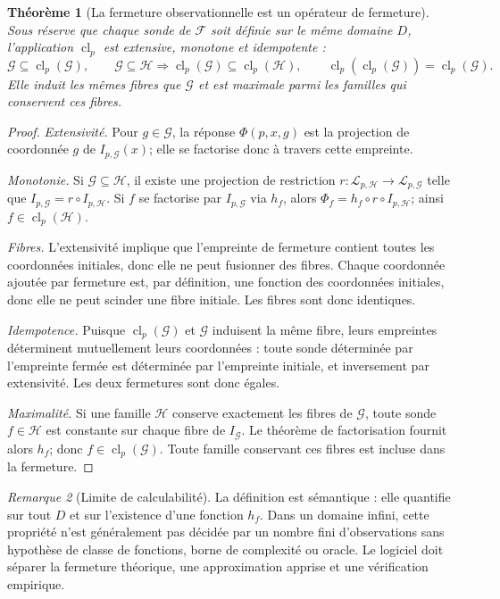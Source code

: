 \documentclass[11pt,oneside]{book}
\newtheorem{theoreme}{Théorème}[chapter]
\theoremstyle{definition}
\theoremstyle{remark}
\newtheorem{remarque}[theoreme]{Remarque}
\newcommand{\Fcal}{\mathcal F}
\newcommand{\Gcal}{\mathcal G}
\newcommand{\Lcal}{\mathcal L}
\newcommand{\Hcal}{\mathcal H}
\newcommand{\1}{\mathbf 1}
\newcommand{\cl}{\operatorname{cl}}
\begin{document}
\begin{theoreme}[La fermeture observationnelle est un opérateur de fermeture]
Sous réserve que chaque sonde de $\Fcal$ soit définie sur le même domaine $D$, l'application $\cl_p$ est extensive, monotone et idempotente :
\[
\Gcal\subseteq\cl_p(\Gcal),\qquad
\Gcal\subseteq\Hcal\Rightarrow\cl_p(\Gcal)\subseteq\cl_p(\Hcal),\qquad
\cl_p(\cl_p(\Gcal))=\cl_p(\Gcal).
\]
Elle induit les mêmes fibres que $\Gcal$ et est maximale parmi les familles qui conservent ces fibres.
\end{theoreme}
\begin{proof}
\emph{Extensivité.} Pour $g\in\Gcal$, la réponse $\Phi(p,x,g)$ est la projection de coordonnée $g$ de $I_{p,\Gcal}(x)$; elle se factorise donc à travers cette empreinte.

\emph{Monotonie.} Si $\Gcal\subseteq\Hcal$, il existe une projection de restriction $r:\Lcal_{p,\Hcal}\to\Lcal_{p,\Gcal}$ telle que $I_{p,\Gcal}=r\circ I_{p,\Hcal}$. Si $f$ se factorise par $I_{p,\Gcal}$ via $h_f$, alors $\Phi_f=h_f\circ r\circ I_{p,\Hcal}$; ainsi $f\in\cl_p(\Hcal)$.

\emph{Fibres.} L'extensivité implique que l'empreinte de fermeture contient toutes les coordonnées initiales, donc elle ne peut fusionner des fibres. Chaque coordonnée ajoutée par fermeture est, par définition, une fonction des coordonnées initiales, donc elle ne peut scinder une fibre initiale. Les fibres sont donc identiques.

\emph{Idempotence.} Puisque $\cl_p(\Gcal)$ et $\Gcal$ induisent la même fibre, leurs empreintes déterminent mutuellement leurs coordonnées : toute sonde déterminée par l'empreinte fermée est déterminée par l'empreinte initiale, et inversement par extensivité. Les deux fermetures sont donc égales.

\emph{Maximalité.} Si une famille $\Hcal$ conserve exactement les fibres de $\Gcal$, toute sonde $f\in\Hcal$ est constante sur chaque fibre de $I_{\Gcal}$. Le théorème de factorisation fournit alors $h_f$; donc $f\in\cl_p(\Gcal)$. Toute famille conservant ces fibres est incluse dans la fermeture.
\end{proof}

\begin{remarque}[Limite de calculabilité]
La définition est sémantique : elle quantifie sur tout $D$ et sur l'existence d'une fonction $h_f$. Dans un domaine infini, cette propriété n'est généralement pas décidée par un nombre fini d'observations sans hypothèse de classe de fonctions, borne de complexité ou oracle. Le logiciel doit séparer la fermeture théorique, une approximation apprise et une vérification empirique.
\end{remarque}
\end{document}

